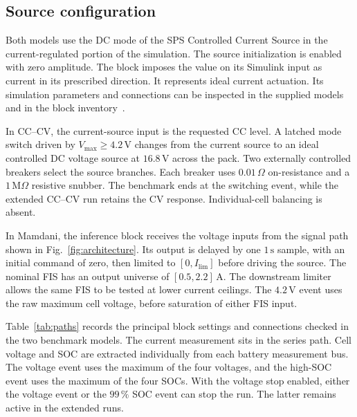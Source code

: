 \documentclass[a4paper,10pt,twocolumn]{article}
\begin{document}
\subsection{Source configuration}
Both models use the DC mode of the SPS Controlled Current Source in the current-regulated portion of the simulation. The source initialization is enabled with zero amplitude. The block imposes the value on its Simulink input as current in its prescribed direction. It represents ideal current actuation. Its simulation parameters and connections can be inspected in the supplied models and in the block inventory~\cite{mathworks_sps}.

In CC--CV, the current-source input is the requested CC level. A latched mode switch driven by $V_{\max}\ge4.2\,\mathrm{V}$ changes from the current source to an ideal controlled DC voltage source at $16.8\,\mathrm{V}$ across the pack. Two externally controlled breakers select the source branches. Each breaker uses $0.01\,\Omega$ on-resistance and a $1\,\mathrm{M}\Omega$ resistive snubber. The benchmark ends at the switching event, while the extended CC--CV run retains the CV response. Individual-cell balancing is absent.

In Mamdani, the inference block receives the voltage inputs from the signal path shown in Fig.~\ref{fig:architecture}. Its output is delayed by one $1\,\mathrm{s}$ sample, with an initial command of zero, then limited to $[0,I_{\mathrm{lim}}]$ before driving the source. The nominal FIS has an output universe of $[0.5,2.2]\,\mathrm{A}$. The downstream limiter allows the same FIS to be tested at lower current ceilings. The $4.2\,\mathrm{V}$ event uses the raw maximum cell voltage, before saturation of either FIS input.

Table~\ref{tab:paths} records the principal block settings and connections checked in the two benchmark models. The current measurement sits in the series path. Cell voltage and SOC are extracted individually from each battery measurement bus. The voltage event uses the maximum of the four voltages, and the high-SOC event uses the maximum of the four SOCs. With the voltage stop enabled, either the voltage event or the $99\,\%$ SOC event can stop the run. The latter remains active in the extended runs.
\end{document}
